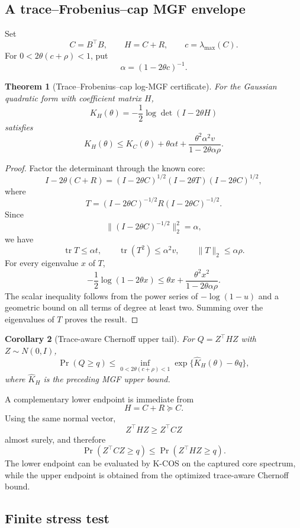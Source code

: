 \documentclass[11pt]{article}
\newtheorem{theorem}{Theorem}[section]
\newtheorem{corollary}[theorem]{Corollary}
\theoremstyle{definition}
\theoremstyle{remark}
\begin{document}
\subsection{A trace--Frobenius--cap MGF envelope}

Set
\[
C=B^\top B,
\qquad
H=C+R,
\qquad
c=\lambda_{\max}(C).
\]
For \(0<2\theta(c+\rho)<1\), put
\[
\alpha=(1-2\theta c)^{-1}.
\]

\begin{theorem}[Trace--Frobenius--cap log-MGF certificate]
For the Gaussian quadratic form with coefficient matrix \(H\),
\[
K_H(\theta)
=-\frac12\log\det(I-2\theta H)
\]
satisfies
\[
\boxed{
K_H(\theta)
\le
K_C(\theta)
+
\theta\alpha t
+
\frac{\theta^2\alpha^2v}
     {1-2\theta\alpha\rho}.
}
\]
\end{theorem}

\begin{proof}
Factor the determinant through the known core:
\[
I-2\theta(C+R)
=
(I-2\theta C)^{1/2}
(I-2\theta T)
(I-2\theta C)^{1/2},
\]
where
\[
T=(I-2\theta C)^{-1/2}
R
(I-2\theta C)^{-1/2}.
\]
Since
\[
\|(I-2\theta C)^{-1/2}\|_2^2=\alpha,
\]
we have
\[
\operatorname{tr}T\le\alpha t,
\qquad
\operatorname{tr}(T^2)\le\alpha^2v,
\qquad
\|T\|_2\le\alpha\rho.
\]
For every eigenvalue \(x\) of \(T\),
\[
-\frac12\log(1-2\theta x)
\le
\theta x
+
\frac{\theta^2x^2}
     {1-2\theta\alpha\rho}.
\]
The scalar inequality follows from the power series of \(-\log(1-u)\) and a
geometric bound on all terms of degree at least two.  Summing over the
eigenvalues of \(T\) proves the result.
\end{proof}

\begin{corollary}[Trace-aware Chernoff upper tail]
For \(Q=Z^\top HZ\) with \(Z\sim N(0,I)\),
\[
\boxed{
\Pr(Q\ge q)
\le
\inf_{0<2\theta(c+\rho)<1}
\exp\{\widehat K_H(\theta)-\theta q\},
}
\]
where \(\widehat K_H\) is the preceding MGF upper bound.
\end{corollary}

A complementary lower endpoint is immediate from
\[
H=C+R\succeq C.
\]
Using the same normal vector,
\[
Z^\top HZ\ge Z^\top CZ
\]
almost surely, and therefore
\[
\boxed{
\Pr(Z^\top CZ\ge q)
\le
\Pr(Z^\top HZ\ge q).
}
\]
The lower endpoint can be evaluated by K-COS on the captured core spectrum,
while the upper endpoint is obtained from the optimized trace-aware Chernoff
bound.

\subsection{Finite stress test}
\end{document}
